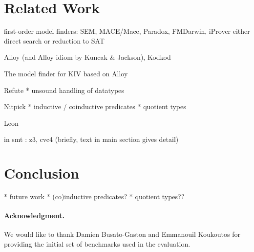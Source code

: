 \documentclass[runningheads,a4paper]{llncs}
\begin{document}
\section{Related Work}

first-order model finders: SEM, MACE/Mace, Paradox, FMDarwin, iProver
  either direct search or reduction to SAT

Alloy (and Alloy idiom by Kuncak \& Jackson), Kodkod

The model finder for KIV based on Alloy

Refute
  * unsound handling of datatypes

Nitpick
  * inductive / coinductive predicates
  * quotient types

Leon

in smt : z3, cvc4 (briefly, text in main section gives detail)


\section{Conclusion}
\label{sec:conclusion}

  * future work
    * (co)inductive predicates?
    * quotient types??

{%
\def\ackname{Acknowledgment}
\paragraph{%
\ackname.}
We would like to thank Damien Busato-Gaston and Emmanouil Koukoutos for
providing the initial set of benchmarks used in the evaluation.
}



{


}
\end{document}
